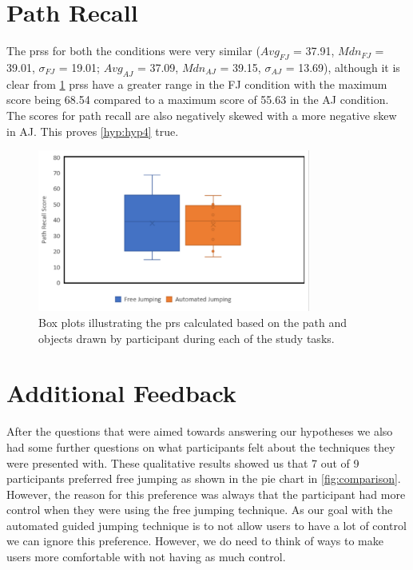 \section{Path Recall}
\label{subsection EUS: Path Recall}
The \acrfull{prs}s for both the conditions were very similar
($Avg_{FJ}$ = 37.91, $Mdn_{FJ}$ = 39.01, $\sigma_{FJ}$ = 19.01; $Avg_{AJ}$ = 37.09, $Mdn_{AJ}$ = 39.15, $\sigma_{AJ}$ = 13.69), although it is clear from \cref{fig:path-recall} \acrshort{prs}s have a greater range in the FJ condition with the maximum score being 68.54 compared to a maximum score of 55.63 in the AJ condition. The scores for path recall are also negatively skewed with a more negative skew in AJ. This proves \cref{hyp:hyp4} true.

\begin{figure}[]
	\centering
	\includegraphics[width=0.8\textwidth]{images/path-recall.pdf}
	\caption{Box plots illustrating the \acrshort{prs} calculated based on the path and objects drawn by participant during each of the study tasks.}
	\label{fig:path-recall}
\end{figure}
\section{Additional Feedback}
\label{subsection EUS: Additional Feedback}
After the questions that were aimed towards answering our hypotheses we also had some further questions on what participants felt about the techniques they were presented with. These qualitative results showed us that 7 out of 9 participants preferred free jumping as shown in the pie chart in \cref{fig:comparison}. However, the reason for this preference was always that the participant had more control when they were using the free jumping technique. As our goal with the automated guided jumping technique is to not allow users to have a lot of control we can ignore this preference. However, we do need to think of ways to make users more comfortable with not having as much control. 

